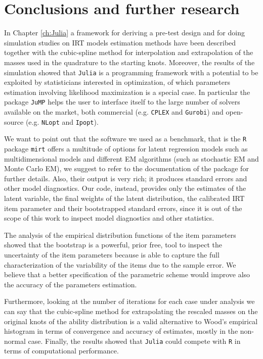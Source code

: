 \chapter{Conclusions and further research}\label{sec:conclusions}



In Chapter \ref{ch:Julia} a framework for deriving a pre-test design and for doing simulation studies on IRT models estimation methods have been described together with the cubic-spline method for interpolation and extrapolation of the masses used in the quadrature to the starting knots.
Moreover, the results of the simulation showed that \texttt{Julia} is a programming framework with a potential to be exploited by statisticians interested in optimization, of which parameters estimation involving likelihood maximization is a special case. In particular the package \texttt{JuMP} helps the user to interface itself to the large number of solvers available on the market, both commercial (e.g. \texttt{CPLEX} and \texttt{Gurobi}) and open-source (e.g. \texttt{NLopt} and \texttt{Ipopt}).

We want to point out that the software we used as a benchmark, that is the \texttt{R} package \texttt{mirt} offers a multitude of options for latent regression models such as multidimensional models and different EM algorithms (such as stochastic EM and Monte Carlo EM), we suggest to refer to the documentation of the package for further details. Also, their output is very rich; it produces standard errors and other model diagnostics. Our code, instead, provides only the estimates of the latent variable, the final weights of the latent distribution, the calibrated IRT item parameter and their bootstrapped standard errors, since it is out of the scope of this work to inspect model diagnostics and other statistics. 

The analysis of the empirical distribution functions of the item parameters showed that the bootstrap is a powerful, prior free, tool to inspect the uncertainty of the item parameters because is able to capture the full characterization of the variability of the items due to the sample error. We believe that a better specification of the parametric scheme would improve also the accuracy of the parameters estimation.

Furthermore, looking at the number of iterations for each case under analysis we can say that the cubic-spline method for extrapolating the rescaled masses on the original knots of the ability distribution is a valid alternative to Wood's empirical histogram in terms of convergence and accuracy of estimates, mostly in the non-normal case.
Finally, the results showed that \texttt{Julia} could compete with \texttt{R} in terms of computational performance.





